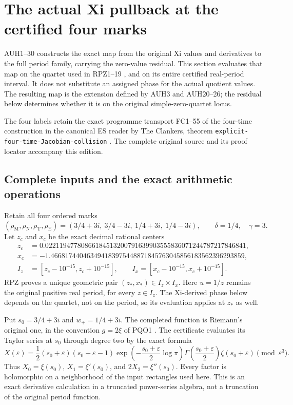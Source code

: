 \section{The actual Xi pullback at the certified four marks}
\label{sec:actual-xi-certificate}

AUH1--30 constructs the exact map from the original Xi values and
derivatives to the full period family, carrying the zero-value residual.
This section evaluates that map on the quartet used in RPZ1--19
\cite{RPZ005}, and on its entire certified real-period interval.
It does not substitute an assigned phase for the actual quotient values.
The resulting map is the extension defined by AUH3 and AUH20--26;
the residual below determines whether it is on the original
simple-zero-quartet locus.

The four labels retain the exact programme transport FC1--55 of the
four-time construction in the canonical ES reader by The Clankers,
theorem \texttt{explicit-four-time-Jacobian-collision} \cite{ES488}.
The complete original source and its proof locator accompany this edition.

\subsection{Complete inputs and the exact arithmetic operations}

Retain all four ordered marks
\[
 (\rho_{\mathrm M},\rho_{\mathrm N},\rho_{\mathrm T},\rho_{\mathrm E})
 =(3/4+3i,\ 3/4-3i,\ 1/4+3i,\ 1/4-3i),\qquad
 \delta=1/4,\quad\gamma=3.
 \tag{RXT1}
\]
Let $z_c$ and $x_c$ be the exact decimal rational centers
\[
\begin{aligned}
 z_c&=0.02211947780866184513200791639903555836071244787217846841,\\
 x_c&=-1.466817440463494183975448871845763045856183562396293859,\\
 I_z&=[z_c-10^{-15},z_c+10^{-15}],\qquad
 I_x=[x_c-10^{-15},x_c+10^{-15}].
\end{aligned}\tag{RXT2}
\]
RPZ proves a unique geometric pair $(z_*,x_*)\in I_z\times I_x$.
Here $u=1/z$ remains the original positive real period, for every
$z\in I_z$. The Xi-derived phase below depends on the quartet,
not on the period, so its evaluation applies at $z_*$ as well.

Put $s_0=3/4+3i$ and $w_+=1/4+3i$. The completed function is
Riemann's original one, in the convention $g=2\xi$ of PQO1
\cite{Cumulative,DLMFXi}. The certificate evaluates its Taylor
series at $s_0$ through degree two by the exact formula
\[
 X(\varepsilon)=\frac12(s_0+\varepsilon)(s_0+\varepsilon-1)
 \exp\!\left(-\frac{s_0+\varepsilon}{2}\log\pi\right)
 \Gamma\!\left(\frac{s_0+\varepsilon}{2}\right)
 \zeta(s_0+\varepsilon)\pmod{\varepsilon^3}.
 \tag{RXT3}
\]
Thus $X_0=\xi(s_0)$, $X_1=\xi'(s_0)$, and
$2X_2=\xi''(s_0)$. Every factor is holomorphic on a
neighborhood of the input rectangles used here. This is an exact
derivative calculation in a truncated power-series algebra, not
a truncation of the original period function.

